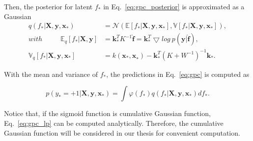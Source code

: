 Then, the posterior for latent $f_*$ in Eq.~\eqref{eq:gpc_posterior} is approximated as a Gaussian
\begin{align}
	q(f_*|\mathbf{X},\mathbf{y},\mathbf{x}_*) &= \mathcal{N}(\mathbb{E}[f_*|\mathbf{X},\mathbf{y},\mathbf{x}_*],\mathbb{V}[f_*|\mathbf{X},\mathbf{y},\mathbf{x}_*]),\\
	with~~~~~~~~~~~~\mathbb{E}_q[f_*|\mathbf{X},\mathbf{y}] &= \mathbf{k}_*^T K^{-1} \hat{\mathbf{f}} = \mathbf{k}_*^T \bigtriangledown log~p(\mathbf{y}|\hat{\mathbf{f}}) ,\\
	\mathbb{V}_q[f_*|\mathbf{X},\mathbf{y},\mathbf{x}_*] &= k(\mathbf{x}_*\mathbf{,x}_*)-\mathbf{k}_*^T(K+W^{-1})^{-1}\mathbf{k}_*.
\end{align}

With the mean and variance of $f_*$, the predictions in Eq.~\eqref{eq:gpc} is computed as 

\begin{equation}
	p(y_*=+1|\mathbf{X},\mathbf{y},\mathbf{x}_*) = \int \varphi(f_*)q(f_*|\mathbf{X},\mathbf{y},\mathbf{x}_*) df_* .\label{eq:gpc_lp}
\end{equation}

Notice that, if the sigmoid function is cumulative Gaussian function, Eq.~\eqref{eq:gpc_lp} can be computed analytically. Therefore, the cumulative Gaussian function will be considered in our thesis for convenient computation. 


